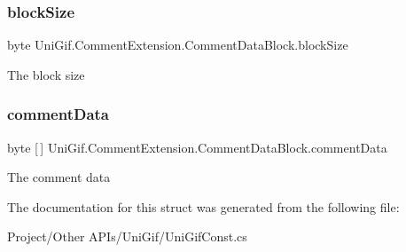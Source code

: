 \subsubsection{\texorpdfstring{block\+Size}{blockSize}}
{\footnotesize\ttfamily byte Uni\+Gif.\+Comment\+Extension.\+Comment\+Data\+Block.\+block\+Size}



The block size 

\mbox{\label{struct_uni_gif_1_1_comment_extension_1_1_comment_data_block_a7c64990ce578bb5473028decc8b1cef2}} 
\subsubsection{\texorpdfstring{comment\+Data}{commentData}}
{\footnotesize\ttfamily byte \mbox{[}$\,$\mbox{]} Uni\+Gif.\+Comment\+Extension.\+Comment\+Data\+Block.\+comment\+Data}



The comment data 



The documentation for this struct was generated from the following file\+:\begin{DoxyCompactItemize}
\item 
Project/\+Other A\+P\+Is/\+Uni\+Gif/Uni\+Gif\+Const.\+cs\end{DoxyCompactItemize}
